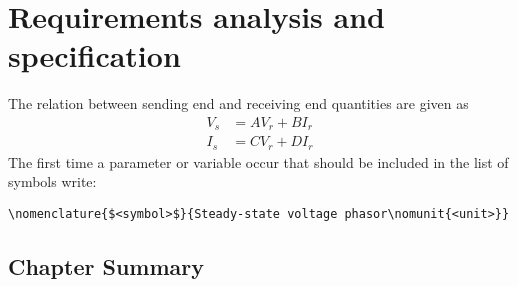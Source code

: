 
\chapter[Requirements]{Requirements analysis and specification}
\label{chap:requirements}

The relation between sending end and receiving end quantities are given as
%
\begin{subequations}\label{eq:GenericTwoPort}
\begin{align}
  V_s &= AV_r + BI_r \\
  I_s &= CV_r + DI_r 
\end{align}
\end{subequations}%
%
%
%
%
%
The first time a parameter or variable occur that should be included in the list
of symbols write:

\verb+\nomenclature{$<symbol>$}{Steady-state voltage phasor\nomunit{<unit>}}+



\section{Chapter Summary}
\label{sec:SummaryChap2}



